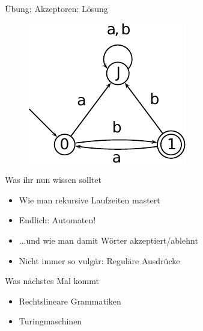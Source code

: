 \begin{frame}{Übung: Akzeptoren: Lösung}
	\begin{figure}
		\centering
		\includegraphics[width=0.7\linewidth]{automaten/Loesung2.pdf}
	\end{figure}
\end{frame}




\begin{frame}	
	\begin{block}{Was ihr nun wissen solltet}
		\begin{itemize}
			\item Wie man rekursive Laufzeiten mastert
			\item Endlich: Automaten!
			\item ...und wie man damit Wörter akzeptiert/ablehnt
			\item Nicht immer so vulgär: Reguläre Ausdrücke
		\end{itemize}
	\end{block}
	
	\begin{block}{Was nächstes Mal kommt}
		\begin{itemize}
			\item Rechtslineare Grammatiken
			\item Turingmaschinen
		\end{itemize}
	\end{block}
\end{frame}


\slideThanks

